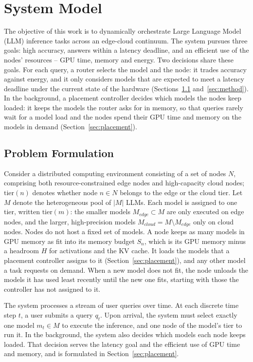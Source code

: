 \chapter{System Model}
\label{chapter:model}

The objective of this work is to dynamically orchestrate Large Language Model (LLM) inference tasks across an edge-cloud continuum.
The system pursues three goals: high accuracy, answers within a latency deadline, and an efficient use of the nodes' resources -- GPU time, memory and energy.
Two decisions share these goals.
For each query, a router selects the model and the node: it trades accuracy against energy, and it only considers models that are expected to meet a latency deadline under the current state of the hardware (Sections~\ref{sec:problem} and~\ref{sec:method}).
In the background, a placement controller decides which models the nodes keep loaded: it keeps the models the router asks for in memory, so that queries rarely wait for a model load and the nodes spend their GPU time and memory on the models in demand (Section~\ref{sec:placement}).

\section{Problem Formulation}
\label{sec:problem}

Consider a distributed computing environment consisting of a set of nodes $N$, comprising both resource-constrained edge nodes and high-capacity cloud nodes;
$\mathrm{tier}(n)$ denotes whether node $n \in N$ belongs to the edge or the cloud tier.
Let $M$ denote the heterogeneous pool of $|M|$ LLMs.
Each model is assigned to one tier, written $\mathrm{tier}(m)$: the smaller models $M_{edge} \subset M$ are only executed on edge nodes, and the larger, high-precision models $M_{cloud} = M \setminus M_{edge}$ only on cloud nodes.
Nodes do not host a fixed set of models.
A node keeps as many models in GPU memory as fit into its memory budget $S_n$, which is its GPU memory minus a headroom $H$ for activations and the KV cache.
It loads the models that a placement controller assigns to it (Section~\ref{sec:placement}), and any other model a task requests on demand.
When a new model does not fit, the node unloads the models it has used least recently until the new one fits, starting with those the controller has not assigned to it.

The system processes a stream of user queries over time.
At each discrete time step $t$, a user submits a query $q_t$.
Upon arrival, the system must select exactly one model $m_t \in M$ to execute the inference, and one node of the model's tier to run it.
In the background, the system also decides which models each node keeps loaded.
That decision serves the latency goal and the efficient use of GPU time and memory, and is formulated in Section~\ref{sec:placement}.


